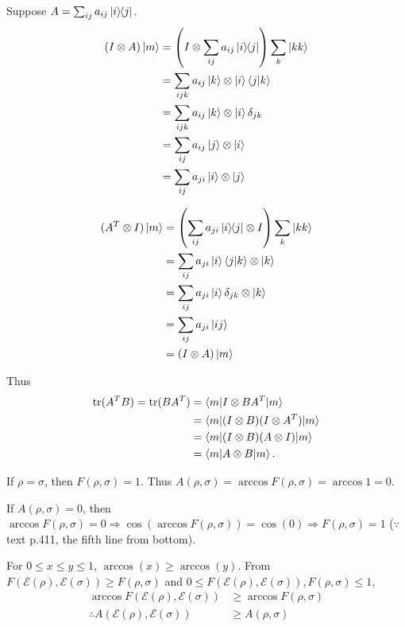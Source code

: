Suppose $A = \sum_{ij} a_{ij} \ket{i}\hspace{-1mm} \bra{j}$.
\begin{align*}
     (I \otimes A)\ket{ m} &= \left(I \otimes  \sum_{ij} a_{ij} \ket{i}\hspace{-1mm} \bra{j}\right) \sum_k \ket{kk}\\
        &= \sum_{ijk} a_{ij} \ket{k} \otimes \ket{i} \braket{j | k}\\
        &= \sum_{ijk} a_{ij} \ket{k} \otimes \ket{i} \delta_{jk}\\
        &= \sum_{ij} a_{ij} \ket{j} \otimes \ket{i}\\
        &= \sum_{ij} a_{ji} \ket{i} \otimes \ket{j}
\end{align*}

\begin{align*}
    (A^T \otimes I) \ket{m} &= \left(\sum_{ij} a_{ji} \ket{i}\hspace{-1mm} \bra{j} \otimes I\right) \sum_k \ket{kk}\\
        &= \sum_{ij} a_{ji} \ket{i} \braket{j | k} \otimes \ket{k}\\
        &= \sum_{ij} a_{ji} \ket{i} \delta_{jk} \otimes \ket{k}\\
        &= \sum_{ij} a_{ji} \ket{ij}\\
        &= (I \otimes A)\ket{ m }
\end{align*}

Thus
\begin{align*}
    \operatorname{tr} (A^T B) = \operatorname{tr}(BA^T) &= \braket{m | I \otimes BA^T |m}\\
    &= \braket{m | (I \otimes B)(I \otimes A^T) |m}\\
    &= \braket{m | (I \otimes B)(A \otimes I) |m}\\ 
    &= \braket{m | A \otimes B | m}.
\end{align*}

If $\rho = \sigma$, then $F(\rho, \sigma) = 1$. Thus $A(\rho, \sigma) = \arccos F(\rho, \sigma) = \arccos 1 = 0$.

If $A(\rho, \sigma) = 0$, then $\arccos F(\rho, \sigma) = 0 \Rightarrow \cos (\arccos F(\rho, \sigma)) = \cos(0) \Rightarrow F(\rho, \sigma) = 1$ ($\because$ text p.411, the fifth line from bottom).


For $0 \leq x \leq y \leq 1$, $\arccos(x) \geq \arccos(y)$. From $F(\mathcal{E}(\rho), \mathcal{E}(\sigma)) \geq F(\rho, \sigma)$ and $0 \leq F(\mathcal{E}(\rho), \mathcal{E}(\sigma)), F(\rho, \sigma) \leq 1$,
\begin{align*}
    \arccos F(\mathcal{E}(\rho), \mathcal{E}(\sigma)) &\geq \arccos F(\rho, \sigma)\\
    \therefore A (\mathcal{E}(\rho), \mathcal{E}(\sigma)) &\geq A(\rho, \sigma)
\end{align*}



